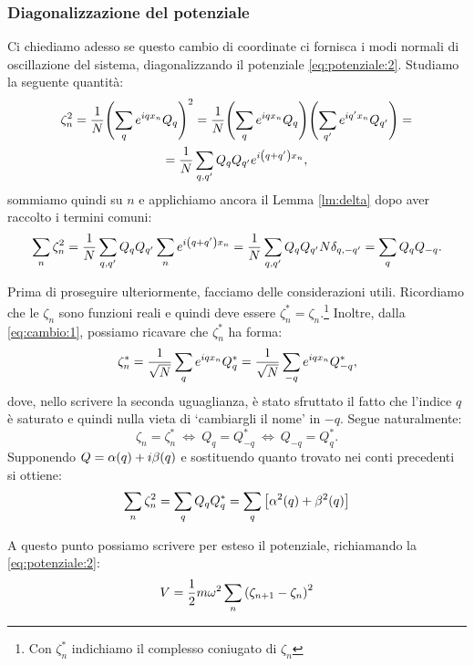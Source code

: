         \subsubsection{Diagonalizzazione del potenziale}
            Ci chiediamo adesso se questo cambio di coordinate ci fornisca i modi normali di oscillazione del sistema, diagonalizzando il potenziale \eqref{eq:potenziale:2}. Studiamo la seguente quantit\`a:
            \begin{multline*}
                \zeta_n^2=\frac{1}{N}\qty(\sum_q e^{iqx_n}Q_q)^2=\frac{1}{N}\qty(\sum_q e^{iqx_n}Q_q)\Biggl(\sum_{q'} e^{iq'x_n}Q_{q'}\Biggr)=\\=\frac{1}{N}\sum_{q,q'}Q_qQ_{q'}e^{i\qty(q+q')x_n},
            \end{multline*}
            sommiamo quindi su $n$ e applichiamo ancora il Lemma \ref{lm:delta} dopo aver raccolto i termini comuni: $$\sum_n\zeta_n^2=\frac{1}{N}\sum_{q,q'}Q_qQ_{q'}\sum_ne^{i\qty(q+q')x_n}=\frac{1}{N}\sum_{q,q'}Q_qQ_{q'}N\delta_{q,-q'}=\sum_qQ_qQ_{-q}.$$
            \par Prima di proseguire ulteriormente, facciamo delle considerazioni utili. Ricordiamo che le $\zeta_n$ sono funzioni reali e quindi deve essere $\zeta_n^*=\zeta_n$.\footnote{Con $\zeta_n^*$ indichiamo il complesso coniugato di $\zeta_n$} Inoltre, dalla \eqref{eq:cambio:1}, possiamo ricavare che $\zeta_n^*$ ha forma:
                $$\zeta_n^*=\frac{1}{\sqrt{N}}\sum_qe^{iqx_n}Q_q^*=\frac{1}{\sqrt{N}}\sum_{-q}e^{iqx_n}Q_{-q}^*,$$
            dove, nello scrivere la seconda uguaglianza, \`e stato sfruttato il fatto che l'indice $q$ \`e saturato e quindi nulla vieta di `cambiargli il nome' in $-q$. Segue naturalmente:
            \begin{equation}
                \zeta_n=\zeta_n^*\ \iff\ Q_q=Q_{-q}^*\ \iff\ Q_{-q}=Q_q^*.
                \label{eq:QQ}
            \end{equation}
            Supponendo $Q=\alpha\qty(q)+i\beta\qty(q)$ e sostituendo quanto trovato nei conti precedenti si ottiene:
            \begin{equation}
                \sum_n\zeta_n^2=\sum_qQ_qQ_q^*=\sum_q\qty[\alpha^2\qty(q)+\beta^2\qty(q)]
                \label{eq:sommazetaquadro}
            \end{equation}
            \par A questo punto possiamo scrivere per esteso il potenziale, richiamando la \eqref{eq:potenziale:2}:
                $$V=\frac{1}{2}m\omega^2\sum_n\qty(\zeta_{n+1}-\zeta_n)^2$$
